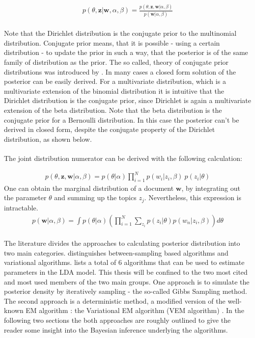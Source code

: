 \documentclass[11pt,a4paper]{article}
\begin{document}
\begin{align}\label{posterior}
p(\theta,\textbf{z}|\textbf{w},\alpha,\beta)= \frac{p(\theta,\textbf{z},\textbf{w}|\alpha,\beta)}
{p(\textbf{w}|\alpha, \beta)}
\end{align}
\ \\
Note that the Dirichlet distribution is the conjugate prior to the multinomial distribution. Conjugate prior means, that it is possible - using a certain distribution - to update the prior in such a way, that the posterior is of the same family of distribution as the prior. The so called, theory of conjugate prior distributions was introduced by \cite{Raiffa1961}. In many cases a closed form solution of the posterior can be easily derived. For a multivariate distribution, which is a multivariate extension of the binomial distribution it is intuitive that the Dirichlet distribution is the conjugate prior, since Dirichlet is again a multivariate extension of the beta distribution. Note that the beta distribution is the conjugate prior for a Bernoulli distribution. In this case the posterior can’t be derived in closed form, despite the conjugate property of the Dirichlet distribution, as shown below.\\
\ \\
The joint distribution numerator can be derived with the following calculation:

\begin{align}\label{joint}
p(\theta,\textbf{z},\textbf{w}|\alpha,\beta)=p(\theta|\alpha)\prod_{i=1}^{N}p(w_i|z_i,\beta)\ p(z_i|\theta)
\end{align}
One can obtain the marginal distribution of a document $\textbf{w}$, by integrating out the parameter $\theta$ and summing up the topics $z_j$. Nevertheless, this expression is intractable.
\begin{align}\label{marginal}
p(\textbf{w}|\alpha, \beta)=\int p(\theta|\alpha) \left( \prod_{i=1}^{N} \sum_{z_i}p(z_i|\theta)p(w_n|z_i,\beta) \right) d\theta
\end{align}
\ \\
The literature divides the approaches to calculating posterior distribution into two main categories.\cite{Blei2012} distinguishes between-sampling based algorithms and variational algorithms. \cite{Powieser2012} lists a total of 6 algorithms that can be used to estimate parameters in the LDA model. This thesis will be confined to the two most cited and most used members of the two main groups. One approach is to simulate the posterior density by iteratively sampling - the so-called Gibbs Sampling method. The second approach is a deterministic method, a modified version of the well-known EM algorithm \cite{Dempster1977}: the Variational EM algorithm (VEM algorithm) \cite{Wainwright2008}. In the following two sections the both approaches are roughly outlined to give the reader some insight into the Bayesian inference underlying the algorithms.
\end{document}
